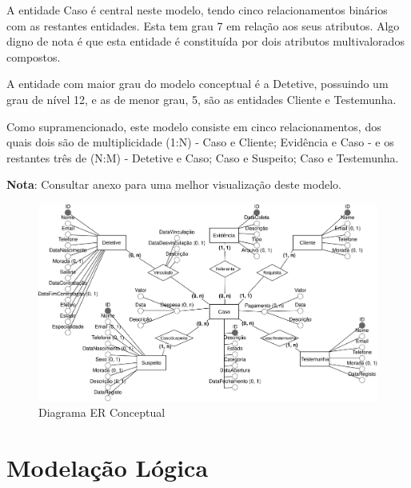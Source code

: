 \documentclass[a4paper,12pt]{scrreprt}
\begin{document}
        A entidade Caso é central neste modelo, tendo cinco relacionamentos binários com as restantes entidades. Esta tem grau 7 em relação aos seus atributos. Algo digno de nota é que esta entidade é constituída por dois atributos multivalorados compostos.

        A entidade com maior grau do modelo conceptual é a Detetive, possuindo um grau de nível 12, e as de menor grau, 5, são as entidades Cliente e Testemunha.

        Como supramencionado, este modelo consiste em cinco relacionamentos, dos quais dois são de multiplicidade (1:N) - Caso e Cliente; Evidência e Caso - e os restantes três de (N:M) - Detetive e Caso; Caso e Suspeito; Caso e Testemunha.

        \textbf{Nota}: Consultar anexo \textit{} para uma melhor visualização deste modelo.

        \clearpage
        \begin{figure}[!ht]
            \centering
            \includegraphics[scale=1.05, angle=270]{images/conceptual.png}
            \caption{Diagrama ER Conceptual}
            \label{fig:3.1}
        \end{figure}



\chapter{Modelação Lógica}
\end{document}
